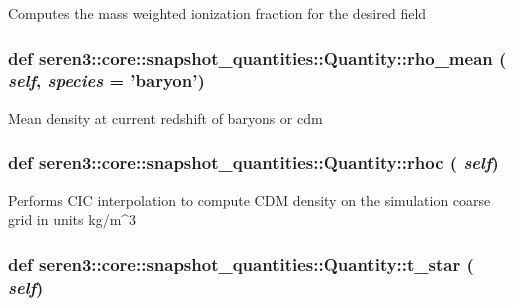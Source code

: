 \begin{DoxyVerb}
Computes the mass weighted ionization fraction for the desired field
\end{DoxyVerb}
 \hypertarget{classseren3_1_1core_1_1snapshot__quantities_1_1Quantity_ac4c8c6f7ba1b4d0e9c5edb5563068a6c}{
\subsubsection[{rho\_\-mean}]{\setlength{\rightskip}{0pt plus 5cm}def seren3::core::snapshot\_\-quantities::Quantity::rho\_\-mean ( {\em self}, \/   {\em species} = {\ttfamily 'baryon'})}}
\label{classseren3_1_1core_1_1snapshot__quantities_1_1Quantity_ac4c8c6f7ba1b4d0e9c5edb5563068a6c}
\begin{DoxyVerb}
Mean density at current redshift of baryons or cdm
\end{DoxyVerb}
 \hypertarget{classseren3_1_1core_1_1snapshot__quantities_1_1Quantity_a5907e12dfe17e75ca69e0b08f8c7ef5d}{
\subsubsection[{rhoc}]{\setlength{\rightskip}{0pt plus 5cm}def seren3::core::snapshot\_\-quantities::Quantity::rhoc ( {\em self})}}
\label{classseren3_1_1core_1_1snapshot__quantities_1_1Quantity_a5907e12dfe17e75ca69e0b08f8c7ef5d}
\begin{DoxyVerb}
Performs CIC interpolation to compute CDM density on the simulation coarse grid in units
kg/m^3
\end{DoxyVerb}
 \hypertarget{classseren3_1_1core_1_1snapshot__quantities_1_1Quantity_a4c619864800c24af98334167387ea2f6}{
\subsubsection[{t\_\-star}]{\setlength{\rightskip}{0pt plus 5cm}def seren3::core::snapshot\_\-quantities::Quantity::t\_\-star ( {\em self})}}
